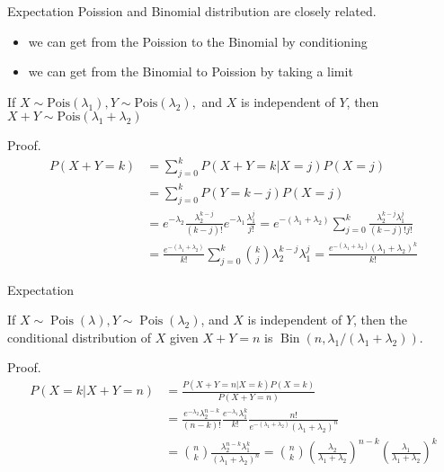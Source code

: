 \documentclass[8pt]{beamer}
\newcommand{\pois}[1]{\text{Pois}(#1)}
\newcommand{\mypois}[1]{\operatorname{Pois}(#1)}
\newcommand{\mybin}[2]{\operatorname{Bin}\!\left(#1,#2\right)}
\begin{document}
\begin{frame}{Expectation}
    Poission and Binomial distribution are closely related.
    \begin{itemize}
        \item we can get from the Poission to the Binomial by conditioning
        \item we can get from the Binomial to Poission by taking a limit
    \end{itemize}

    \begin{theorem}
        If \(X \sim \text{Pois}(\lambda_1), Y \sim \text{Pois}(\lambda_2),\) and \(X\) is independent of \(Y\), then \(X + Y \sim \pois{\lambda_1 + \lambda_2}\)
    \end{theorem}
    Proof.
    \[
        \begin{aligned}
            P(X+Y=k) &= \sum_{j=0}^k P(X+Y=k|X=j) P(X=j)\\
            &= \sum_{j=0}^k P(Y=k-j) P(X=j) \\
            &= e^{-\lambda_2} \frac{\lambda_2^{k-j}}{(k-j)!} e^{-\lambda_1} \frac{\lambda_1^{j}}{j!} = e^{-(\lambda_1+\lambda_2)} \sum_{j=0}^k \frac{\lambda_2^{k-j} \lambda_1^{j}}{(k-j)! j!} \\
            &= \frac{e^{-(\lambda_1 + \lambda_2)}}{k!} \sum_{j=0}^k \binom{k}{j} \lambda_2^{k-j} \lambda_1^j = \frac{e^{-(\lambda_1 + \lambda_2)} (\lambda_1 + \lambda_2)^k}{k!}
        \end{aligned}
    \]
\end{frame}


\begin{frame}{Expectation}
    \begin{theorem}
        If \(X \sim \mypois{\lambda}, Y \sim \mypois{\lambda_2}\), and \(X\) is independent of \(Y\), then the conditional distribution of \(X\) given \(X+Y=n\) is \(\mybin{n}{\lambda_1 / (\lambda_1 + \lambda_2)}\).
    \end{theorem}
    Proof. 
    \[
    \begin{aligned}
        P(X=k|X+Y=n) &= \frac{P(X+Y=n|X=k)P(X=k)}{P(X+Y=n)} \\
        &= \frac{e^{-\lambda_2}\lambda_2^{n-k}}{(n-k)!} \frac{e^{-\lambda_1} \lambda_1^{k}}{k!} \frac{n!}{e^{-(\lambda_1 + \lambda_2)}(\lambda_1 + \lambda_2)^{n}} \\
        &= \binom{n}{k} \frac{\lambda_2^{n-k}\lambda_1^{k}}{(\lambda_1 +\lambda_2)^{n}} = \binom{n}{k} \left(\frac{\lambda_2}{\lambda_1+\lambda_2}\right)^{n-k} \left(\frac{\lambda_1}{\lambda_1 + \lambda_2}\right)^k
    \end{aligned}
    \]
\end{frame}
\end{document}
